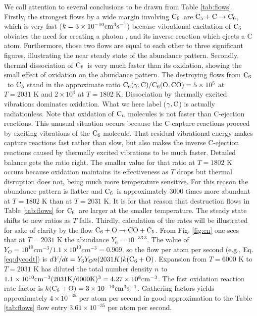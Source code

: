\documentclass[manuscript]{aastex}
\newcommand{\cfive}{{\rm C}_5}
\newcommand{\csix}{{\rm C}_6}
\newcommand{\cenn}{{\rm C}_n}
\newcommand{\cfivectocsix}{$\cfive + {\rm C} \to \csix$}
\newcommand{\csixotococfive}{${\rm C}_6 + {\rm O} \to {\rm CO} + {\rm C_5}$}
\begin{document}
\begin{CJK*}{UTF8}{gbsn}
We call attention to several conclusions to be drawn from Table \ref{tab:flows}.
Firstly, the strongest flows by a wide margin involving $\csix$\ are
\cfivectocsix,
which is very fast ($k = 3 \times 10^{-10} {\rm cm}^3 {\rm s}^{-1}$)
because vibrational excitation of $\csix$
obviates the need for creating a photon \citep{1999Sci...283.1290C},
and its inverse reaction which ejects a C atom. Furthermore, those two flows
are equal to each other to three significant figures, illustrating the near 
steady
state of the abundance pattern. Secondly, thermal dissociation of $\csix$\ is
very much faster than its oxidation, showing the small effect of oxidation
on the abundance pattern. The destroying flows from $\csix$\ to $\cfive$
stand in the approximate ratio
${\rm C}_6(\gamma,{\rm C})/{\rm C_6}({\rm O},{\rm CO}) = 5 \times 10^5$
at $T = 2031$ K and $2 \times 10^4$ at $T = 1802$ K.
Dissociation by thermally excited vibrations dominates oxidation. What we here
label ($\gamma,{\rm C}$) is actually radiationless. Note that oxidation of
$\cenn$ molecules is not faster than C-ejection reactions. This unusual
situation occurs because the C-capture reactions proceed by exciting 
vibrations of the $\csix$ molecule. That residual vibrational energy makes
capture reactions fast rather than slow, but also makes the inverse C-ejection
reactions caused by thermally excited vibrations to be much faster. Detailed
balance gets the ratio right. The smaller value for that ratio at $T=1802$ K
occurs because oxidation maintains its effectiveness as $T$ drops but
thermal disruption does not, being much more temperature sensitive.
For this reason the abundance pattern is flatter and $\csix$\ is approximately
3000 times more abundant at $T=1802$ K than at $T=2031$ K.
It is for that reason that destruction flows in Table \ref{tab:flows}
for $\csix$\ are
larger at the smaller temperature.
The steady state shifts to new ratios as $T$ falls.
Thirdly, calculation of the rates will be illustrated for sake of clarity
by the flow
\csixotococfive.
From Fig. \ref{fig:cn}
one sees that at $T = 2031$ K the abundance $Y_6 = 10^{-33.3}$.
The value of $Y_O = 10^{10} cm^{-3} / 1.1 \times 10^{10} cm^{-3} = 0.909$,
so the flow per atom per
second (e.g., Eq. \ref{eq:dycodt}) is
$dY/dt= Y_6 Y_O n(2031K)k(\csix + {\rm O})$.
Expansion from $T=6000$ K to $T=2031$ K has diluted the total number
density $n$ to $1.1 \times 10^{10}{\rm cm}^{-3}
(2031 {\rm K}/6000 {\rm K})^3 = 4.27 \times 10^8{\rm cm}^{-3}$.
The fast oxidation reaction rate factor is
$k(\csix + {\rm O}) = 3 \times 10^{-10} {\rm cm}^3{\rm s}^{-1}$.
Gathering factors yields approximately $4 \times 10^{-35}$ per atom
per second
in good approximation to the Table \ref{tab:flows}
flow entry $3.61 \times 10^{-35}$ per atom per second.


\end{CJK*}
\end{document}
